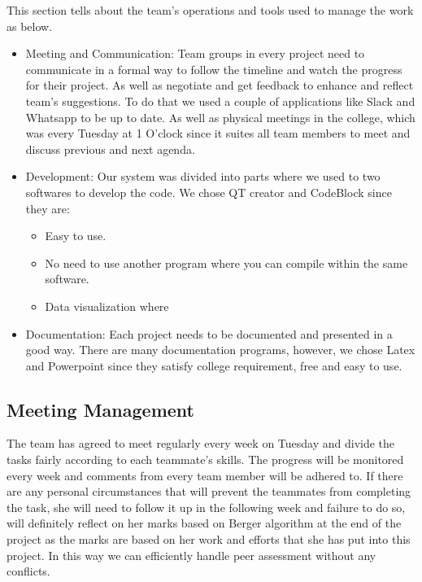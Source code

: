 \documentclass{article}
\begin{document}
This section tells about the team's operations and tools used to manage the work as below.   
\begin{itemize}

\item Meeting and Communication: Team groups in every project need to communicate in a formal way to follow the timeline and watch the progress for their project. As well as negotiate and get feedback to enhance and reflect team’s suggestions. To do that we used a couple of applications like Slack and Whatsapp to be up to date. As well as physical meetings in the college, which was every Tuesday at 1 O’clock since it suites all team members to meet and discuss previous and next agenda. 
\item Development: Our system was divided into parts where we used to two softwares to develop the code. We chose QT creator and CodeBlock since they are:
\begin{itemize}
\item 	Easy to use.
\item	No need to use another program where you can compile within the same software.
\item Data visualization where 

\end{itemize}
\item Documentation: Each project needs to be documented and presented in a good way. There are many documentation programs, however, we chose Latex and Powerpoint since they satisfy college requirement, free and easy to use. 

\end{itemize}



\subsection{Meeting Management} 
The team has agreed to meet regularly every week on Tuesday and divide the tasks fairly according to each teammate's skills. The progress will be monitored every week and comments from every team member will be adhered to. \newline If there are any personal circumstances that will prevent the teammates from completing the task, she will need to follow it up in the following week and failure to do so, will definitely reflect on her marks based on Berger algorithm at the end of the project as the marks are based on her work and efforts that she has put into this project. In this way we can efficiently handle peer assessment without any conflicts. 
\end{document}
